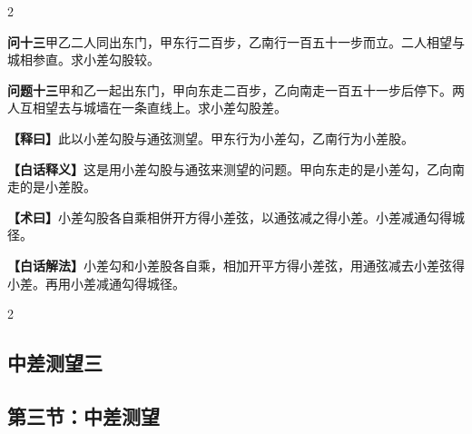 \documentclass[11pt,a4paper]{article}
\newcommand{\WenQuestion}[1]{\textbf{\textcolor{classicalcolor}{#1}}}
\newcommand{\BaiQuestion}[1]{\textbf{\textcolor{moderncolor}{#1}}}
\newcommand{\WenExplain}{\textcolor{classicalcolor}{\textbf{【释曰】}}}
\newcommand{\BaiExplain}{\textcolor{moderncolor}{\textbf{【白话释义】}}}
\newcommand{\WenMethod}{\textcolor{classicalcolor}{\textbf{【术曰】}}}
\newcommand{\BaiMethod}{\textcolor{moderncolor}{\textbf{【白话解法】}}}
\begin{document}
\begin{paracol}{2}
\vspace{0.8em}

\switchcolumn*
\begin{tcolorbox}[colback=red!3,colframe=red!30!black,boxrule=0.3pt]
\WenQuestion{问十三}\quad 甲乙二人同出东门，甲东行二百步，乙南行一百五十一步而立。二人相望与城相参直。求小差勾股较。
\end{tcolorbox}
\switchcolumn
\begin{tcolorbox}[colback=blue!3,colframe=blue!30!black,boxrule=0.3pt]
\BaiQuestion{问题十三}\quad 甲和乙一起出东门，甲向东走二百步，乙向南走一百五十一步后停下。两人互相望去与城墙在一条直线上。求小差勾股差。
\end{tcolorbox}

\switchcolumn*
\begin{tcolorbox}[colback=red!5,colframe=red!30!black,boxrule=0.3pt]
\WenExplain\quad 此以小差勾股与通弦测望。甲东行为小差勾，乙南行为小差股。
\end{tcolorbox}
\switchcolumn
\begin{tcolorbox}[colback=blue!5,colframe=blue!30!black,boxrule=0.3pt]
\BaiExplain\quad 这是用小差勾股与通弦来测望的问题。甲向东走的是小差勾，乙向南走的是小差股。
\end{tcolorbox}

\switchcolumn*
\begin{tcolorbox}[colback=red!5,colframe=red!40!black,boxrule=0.3pt]
\WenMethod\quad 小差勾股各自乘相併开方得小差弦，以通弦减之得小差。小差减通勾得城径。
\end{tcolorbox}
\switchcolumn
\begin{tcolorbox}[colback=blue!5,colframe=blue!40!black,boxrule=0.3pt]
\BaiMethod\quad 小差勾和小差股各自乘，相加开平方得小差弦，用通弦减去小差弦得小差。再用小差减通勾得城径。
\end{tcolorbox}

\end{paracol}

\vspace{0.5em}

\begin{paracol}{2}
\subsection*{\textcolor{sectioncolor}{中差测望三}}
\switchcolumn
\subsection*{\textcolor{sectioncolor}{第三节：中差测望}}
\end{paracol}
\end{document}
